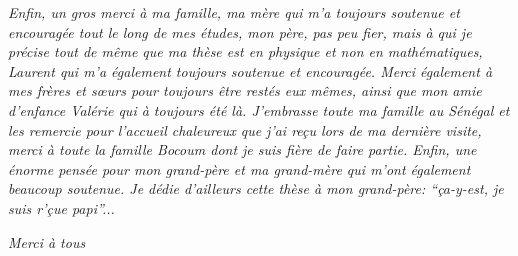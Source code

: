 \documentclass[a4paper,12pt,french]{report}
\begin{document}
\begin{center}
\textit{Enfin, un gros merci à ma famille, ma mère qui m'a toujours soutenue et encouragée tout le long de mes études, mon père, pas peu fier, mais à qui je précise tout de même que ma thèse est en physique et non en mathématiques, Laurent qui m'a également toujours soutenue et encouragée. Merci également à mes frères et sœurs pour toujours être restés eux mêmes, ainsi que mon amie d'enfance Valérie qui à toujours été là. J'embrasse toute ma famille au Sénégal et les remercie pour l'accueil chaleureux que j'ai reçu lors de ma dernière visite, merci à toute la famille Bocoum dont je suis fière de faire partie. 
 Enfin, une énorme pensée pour mon grand-père et ma grand-mère qui m'ont également beaucoup soutenue. Je dédie d'ailleurs cette thèse à mon grand-père: ``ça-y-est, je suis r'çue papi''...}
\end{center}
\thispagestyle{empty}
\begin{center}
\textit{Merci à tous}
\end{center}

 



\tableofcontents



 









\appendix                  
\listoffigures             
\listoftables              
\cleardoublepage
\newpage
\thispagestyle{empty}
\end{document}
